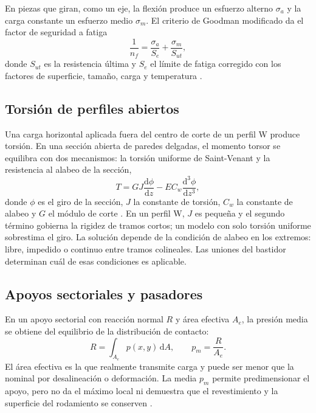 En piezas que giran, como un eje, la flexión produce un esfuerzo alterno $\sigma_a$ y la carga constante un esfuerzo medio $\sigma_m$. El criterio de Goodman modificado da el factor de seguridad a fatiga
\begin{equation}
  \frac{1}{n_f}=\frac{\sigma_a}{S_e}+\frac{\sigma_m}{S_{ut}},
  \label{eq:mt-goodman}
\end{equation}
donde $S_{ut}$ es la resistencia última y $S_e$ el límite de fatiga corregido con los factores de superficie, tamaño, carga y temperatura \cite{shigley2015}.

\subsection{Torsión de perfiles abiertos}

Una carga horizontal aplicada fuera del centro de corte de un perfil W produce torsión. En una sección abierta de paredes delgadas, el momento torsor se equilibra con dos mecanismos: la torsión uniforme de Saint-Venant y la resistencia al alabeo de la sección,
\begin{equation}
  T=GJ\frac{\mathrm{d}\phi}{\mathrm{d}z}-EC_w\frac{\mathrm{d}^3\phi}{\mathrm{d}z^3},
  \label{eq:teo-torsion}
\end{equation}
donde $\phi$ es el giro de la sección, $J$ la constante de torsión, $C_w$ la constante de alabeo y $G$ el módulo de corte \cite{aiscdg9}. En un perfil W, $J$ es pequeña y el segundo término gobierna la rigidez de tramos cortos; un modelo con solo torsión uniforme sobrestima el giro. La solución depende de la condición de alabeo en los extremos: libre, impedido o continuo entre tramos colineales. Las uniones del bastidor determinan cuál de esas condiciones es aplicable.

\subsection{Apoyos sectoriales y pasadores}

En un apoyo sectorial con reacción normal $R$ y área efectiva $A_e$, la presión media se obtiene del equilibrio de la distribución de contacto:
\begin{equation}
  R=\int_{A_e}p(x,y)\,\mathrm{d}A,\qquad p_m=\frac{R}{A_e}.
  \label{eq:mt-pad}
\end{equation}
El área efectiva es la que realmente transmite carga y puede ser menor que la nominal por desalineación o deformación. La media $p_m$ permite predimensionar el apoyo, pero no da el máximo local ni demuestra que el revestimiento y la superficie del rodamiento se conserven \cite{shigley2015,skfmaintenance2011}.

